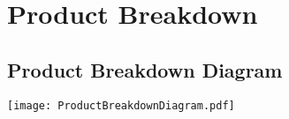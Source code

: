 \documentclass[../report.tex]{subfiles}
\begin{document}
\graphicspath{{img/}{../img/}}

\newpage

\section{Product Breakdown}

\begin{landscape}

\subsection{Product Breakdown Diagram}

\texttt{[image: ProductBreakdownDiagram.pdf]}


\end{landscape}
\end{document}

